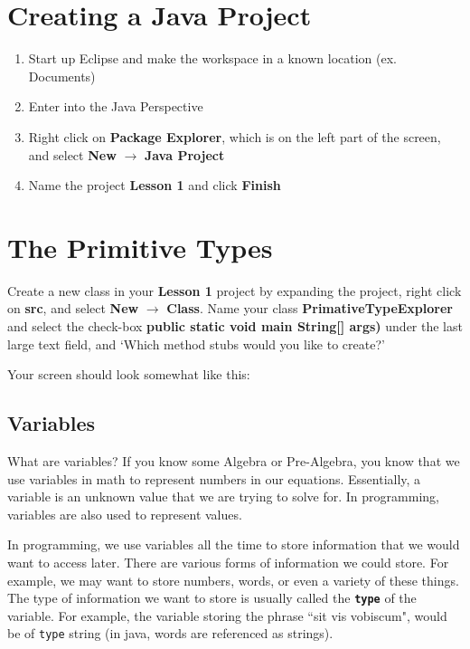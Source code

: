 \documentclass[11pt,fleqn]{article}
\begin{document}
\section{Creating a Java Project}
\begin{enumerate}
\item Start up Eclipse and make the workspace in a known location (ex. Documents)
\item Enter into the Java Perspective
\item Right click on \textbf{Package Explorer}, which is on the left part of the screen, and select \textbf
{New} $\rightarrow$ \textbf{Java Project}
\item Name the project \textbf{Lesson 1} and click \textbf{Finish}
\end{enumerate}

\section{The Primitive Types}
Create a new class in your \textbf{Lesson 1} project by expanding the project, right click on \textbf
{src}, and select \textbf{New} $\rightarrow$ \textbf{Class}. Name your class \textbf{PrimativeTypeExplorer} and select the check-box 
\textbf{public static void main String[] args)} under the last large text field, and `Which method stubs
would you like to create?'

Your screen should look somewhat like this:


\begin{center}
\section*{Variables}
\end{center}

What are variables? If you know some Algebra or Pre-Algebra, you know that
we use variables in math to represent numbers in our equations. Essentially, a
variable is an unknown value that we are trying to solve for. In programming,
variables are also used to represent values. 

In programming, we use variables all the time to store information that we would
want to access later. There are various forms of information we could store. For
example, we may want to store numbers, words, or even a variety of these things.
The type of information we want to store is usually called the
\textbf{\texttt{type}} of the variable. For example, the variable storing the
phrase ``sit vis vobiscum", would be of \texttt{type} string (in java, words are
referenced as strings). 
\end{document}
